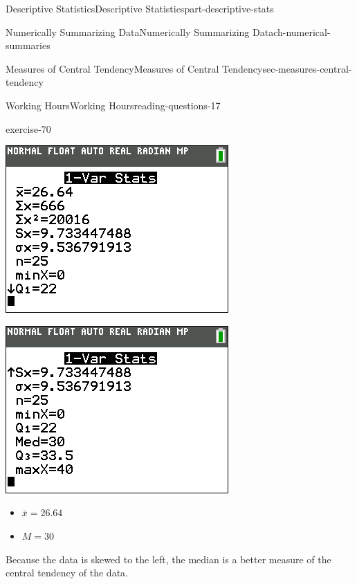 \documentclass[oneside,10pt,]{book}
\numberwithin{equation}{section}
\begin{document}
\begin{partptx}{Descriptive Statistics}{}{Descriptive Statistics}{}{}{part-descriptive-stats}
\begin{chapterptx}{Numerically Summarizing Data}{}{Numerically Summarizing Data}{}{}{ch-numerical-summaries}
\begin{sectionptx}{Measures of Central Tendency}{}{Measures of Central Tendency}{}{}{sec-measures-central-tendency}
\begin{reading-questions-subsection-numberless}{Working Hours}{}{Working Hours}{}{}{reading-questions-17}
\begin{divisionexercise}{2}{}{}{exercise-70}
\begin{sidebyside}{2}{0}{0}{0}
\begin{sbspanel}{0.5}
\includegraphics[width=1\linewidth]{images/hours-worked-mean.png}
\end{sbspanel}%
\begin{sbspanel}{0.5}%
\includegraphics[width=1\linewidth]{images/hours-worked-median.png}
\end{sbspanel}%
\end{sidebyside}%
\par
\hypertarget{p-98}{}%
\leavevmode%
\begin{itemize}[label=\textbullet]
\item{}\(\bar{x} = 26.64\)%
\item{}\(M = 30\)%
\end{itemize}
Because the data is skewed to the left, the median is a better measure of the central tendency of the data.%

\end{divisionexercise}
\end{reading-questions-subsection-numberless}
\end{sectionptx}
\end{chapterptx}
\end{partptx}
\end{document}
